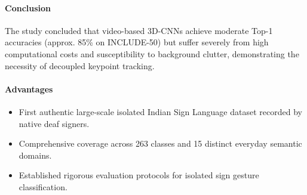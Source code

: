 \begin{table}[h]
\caption{Comparison of Indian Sign Language Benchmark Datasets}
\label{tab:datasets}
\begin{center}
\end{center}
\end{table}

\paragraph{Conclusion}
The study concluded that video-based 3D-CNNs achieve moderate Top-1 accuracies (approx. 85\% on INCLUDE-50) but suffer severely from high computational costs and susceptibility to background clutter, demonstrating the necessity of decoupled keypoint tracking.

\paragraph{Advantages}
\begin{itemize}
    \item First authentic large-scale isolated Indian Sign Language dataset recorded by native deaf signers.
    \item Comprehensive coverage across 263 classes and 15 distinct everyday semantic domains.
    \item Established rigorous evaluation protocols for isolated sign gesture classification.
\end{itemize}

